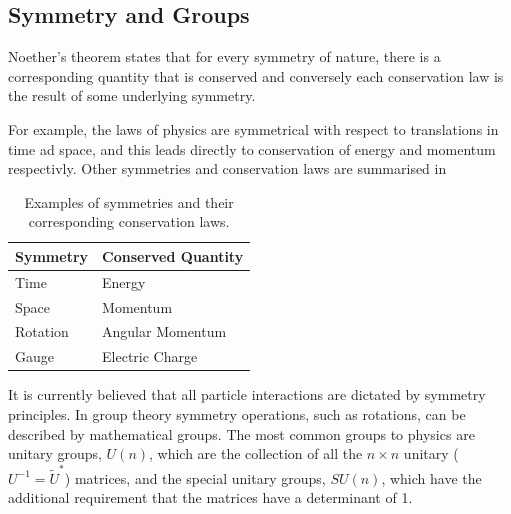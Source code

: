 \subsection{Symmetry and Groups}
Noether's theorem states that for every symmetry of nature, there is
a corresponding quantity that is conserved and conversely each conservation law
is the result of some underlying symmetry.

For example, the laws of physics are symmetrical with respect to translations in
time ad space, and this leads directly to conservation of energy and momentum
respectivly. Other symmetries and conservation laws are summarised in

\begin{table}
\begin{center}
\begin{tabular}{ l l }
Symmetry & Conserved Quantity \\ \hline
Time     & Energy \\
Space    & Momentum \\
Rotation & Angular Momentum \\
Gauge    & Electric Charge \\
\end{tabular}
\caption{Examples of symmetries and their corresponding conservation laws.}
\end{center}
\label{tab:symmetry}
\end{table}

It is currently believed that all particle interactions are dictated by symmetry
principles.  In group theory symmetry operations, such as rotations, can be
described by mathematical groups.
The most common groups to physics are unitary groups, $U(n)$, which are the
collection of all the $n\times n$ unitary ($U^{-1} = \tilde{U}^{*}$) matrices, and
the special unitary groups, $SU(n)$, which have the additional requirement that
the matrices have a determinant of 1.

